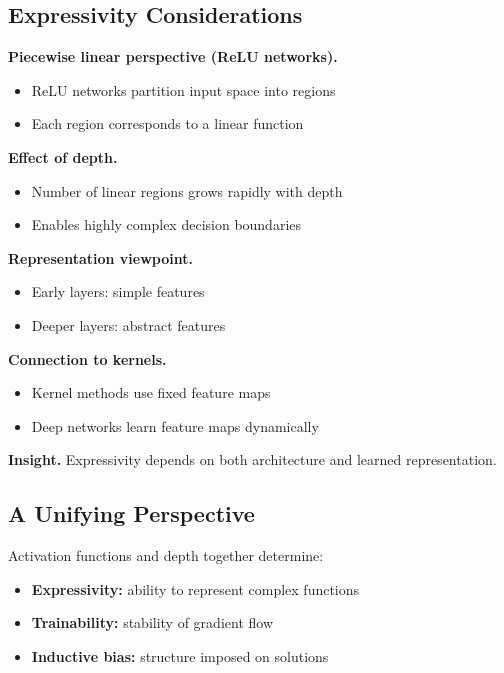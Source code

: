 \subsection{Expressivity Considerations}

\textbf{Piecewise linear perspective (ReLU networks).}

\begin{itemize}
    \item ReLU networks partition input space into regions
    \item Each region corresponds to a linear function
\end{itemize}

\medskip

\noindent
\textbf{Effect of depth.}

\begin{itemize}
    \item Number of linear regions grows rapidly with depth
    \item Enables highly complex decision boundaries
\end{itemize}

\medskip

\noindent
\textbf{Representation viewpoint.}

\begin{itemize}
    \item Early layers: simple features
    \item Deeper layers: abstract features
\end{itemize}

\medskip

\noindent
\textbf{Connection to kernels.}

\begin{itemize}
    \item Kernel methods use fixed feature maps
    \item Deep networks learn feature maps dynamically
\end{itemize}

\medskip

\noindent
\textbf{Insight.}  
Expressivity depends on both architecture and learned representation.

\subsection{A Unifying Perspective}

Activation functions and depth together determine:

\begin{itemize}
    \item \textbf{Expressivity:} ability to represent complex functions
    \item \textbf{Trainability:} stability of gradient flow
    \item \textbf{Inductive bias:} structure imposed on solutions
\end{itemize}

